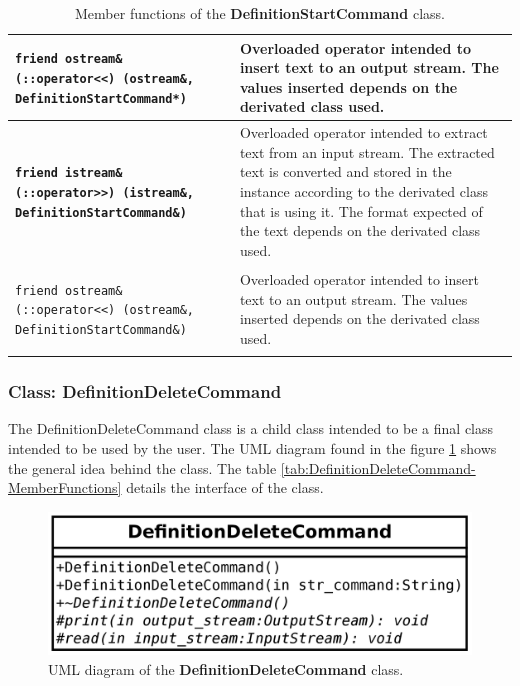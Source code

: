 \documentclass[11pt,twoside,openany,x11names,svgnames]{memoir}
\begin{document}
\begin{table}[h]
\begin{tabular}{| >{\bfseries}p{10cm} | p{5.5cm} |}
	\hline
	
	\texttt{friend ostream\& (::operator<<) (ostream\&, DefinitionStartCommand*)} & Overloaded operator intended to insert text to an output stream. The values inserted depends on the derivated class used. \\
	
	\hline
	
	\texttt{friend istream\& (::operator>>) (istream\&, DefinitionStartCommand\&)} & Overloaded operator intended to extract text from an input stream. The extracted text is converted and stored in the instance according to the derivated class that is using it. The format expected of the text depends on the derivated class used. \\
	
	\hline
	
	\texttt{friend ostream\& (::operator<<) (ostream\&, DefinitionStartCommand\&)} & Overloaded operator intended to insert text to an output stream. The values inserted depends on the derivated class used. \\
	
	\hline
\end{tabular}
\caption{Member functions of the \textbf{DefinitionStartCommand} class.}
\label{tab:DefinitionStartCommand-MemberFunctions}
\end{table}

\clearpage

\subsubsection{Class: DefinitionDeleteCommand}\label{Class-DefinitionDeleteCommand}

The DefinitionDeleteCommand class is a child class intended to be a final class intended to be used by the user. The UML diagram found in the figure \ref{fig:class-definitiondelete-command} shows the general idea behind the class. The table \ref{tab:DefinitionDeleteCommand-MemberFunctions} details the interface of the class.

\begin{figure}
	\centering
	\includegraphics[scale=0.2, clip=true, trim= 0pt 0pt 0pt 0pt]{images/chapter03-image26}
	\caption{UML diagram of the \textbf{DefinitionDeleteCommand} class.}
	\label{fig:class-definitiondelete-command}
\end{figure}
\end{document}
